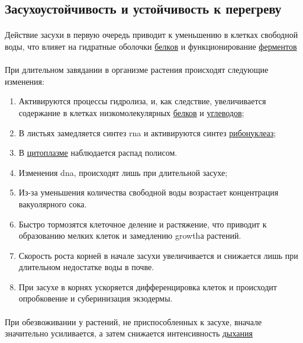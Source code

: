 \subsection*{Засухоустойчивость и устойчивость к перегреву} 

\paragraph*{}Действие засухи в первую очередь приводит к уменьшению в клетках свободной воды, что влияет на гидратные оболочки \hyperlink{proteins}{белков} и функционирование \hyperlink{enzimes}{ферментов}

\paragraph*{}При длительном завядании в организме растения происходят следующие изменения: 

\begin{enumerate}
	\item Активируются процессы гидролиза, и, как следствие, увеличивается содержание в клетках низкомолекулярных \hyperlink{proteins}{белков} и \hyperlink{sect_glycosids}{углеводов};
	\item В листьях замедляется синтез \gls{rna} и активируются синтез \hyperlink{ribonukleasa_quest}{рибонуклеаз}; 
	\item В \hyperlink{plasmolema}{цитоплазме} наблюдается распад полисом. 
	\item Изменения \gls{dna}, происходят лишь при длительной засухе;
	\item Из-за уменьшения количества свободной воды возрастает концентрация вакуолярного сока. 
	\item Быстро тормозятся клеточное деление и растяжение, что приводит к образованию мелких клеток и замедлению \gls{growth}а растений. 
	\item Скорость роста корней в начале засухи увеличивается и снижается лишь при длительном недостатке воды в почве. 
	\item При засухе в корнях ускоряется дифференцировка клеток и происходит опробковение и суберинизация экзодермы. 
\end{enumerate}

\paragraph*{}При обезвоживании у растений, не приспособленных к засухе, вначале значительно усиливается, а затем снижается интенсивность \hyperlink{sect_breazing}{дыхания}

